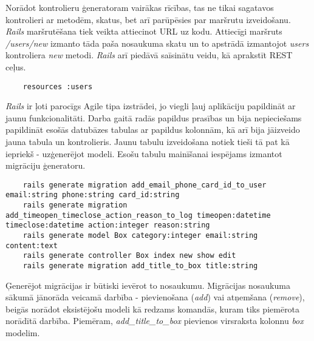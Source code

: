 Norādot kontrolieru ģeneratoram vairākas rīcības, tas ne tikai sagatavos kontrolieri ar metodēm, skatus, bet arī parūpēsies par maršrutu izveidošanu. \textit{Rails} maršrutēšana tiek veikta attiecinot URL uz kodu. Attiecīgi maršruts \textit{/users/new} izmanto tāda paša nosaukuma skatu un to apstrādā izmantojot \textit{users} kontroliera \textit{new} metodi. \textit{Rails} arī piedāvā saīsinātu veidu, kā aprakstīt REST ceļus.
\begin{lstlisting}
	resources :users
\end{lstlisting}

\textit{Rails} ir ļoti parocīgs Agile tipa izstrādei, jo viegli ļauj aplikāciju papildināt ar jaunu funkcionalitāti. Darba gaitā radās papildus prasības un bija nepieciešams papildināt esošās datubāzes tabulas ar papildus kolonnām, kā arī bija jāizveido jauna tabula un kontrolieris. Jaunu tabulu izveidošana notiek tieši tā pat kā iepriekš - uzģenerējot modeli. Esošu tabulu mainīšanai iespējams izmantot migrāciju ģeneratoru.
\begin{lstlisting}
	rails generate migration add_email_phone_card_id_to_user email:string phone:string card_id:string
	rails generate migration add_timeopen_timeclose_action_reason_to_log timeopen:datetime timeclose:datetime action:integer reason:string
	rails generate model Box category:integer email:string content:text
	rails generate controller Box index new show edit
	rails generate migration add_title_to_box title:string
\end{lstlisting}
Ģenerējot migrācijas ir būtiski ievērot to nosaukumu. Migrācijas nosaukuma sākumā jānorāda veicamā darbība - pievienošana (\textit{add}) vai atņemšana (\textit{remove}), beigās norādot eksistējošu modeli kā redzams komandās, kuram tiks piemērota norādītā darbība. Piemēram, \textit{add_title_to_box} pievienos virsraksta kolonnu \textit{box} modelim.


